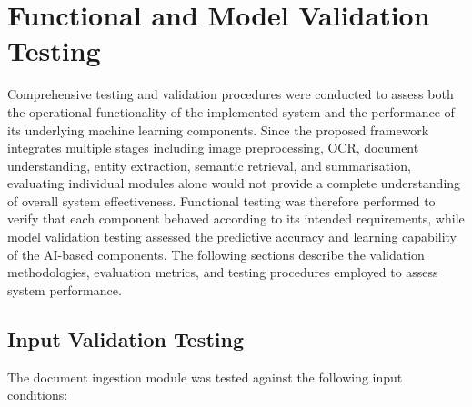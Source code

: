 \section{Functional and Model Validation Testing}

Comprehensive testing and validation procedures were conducted to assess both the operational functionality of the implemented system and the performance of its underlying machine learning components. Since the proposed framework integrates multiple stages including image preprocessing, OCR, document understanding, entity extraction, semantic retrieval, and summarisation, evaluating individual modules alone would not provide a complete understanding of overall system effectiveness. Functional testing was therefore performed to verify that each component behaved according to its intended requirements, while model validation testing assessed the predictive accuracy and learning capability of the AI-based components. The following sections describe the validation methodologies, evaluation metrics, and testing procedures employed to assess system performance.

\subsection{Input Validation Testing}
The document ingestion module was tested against the following input conditions:

